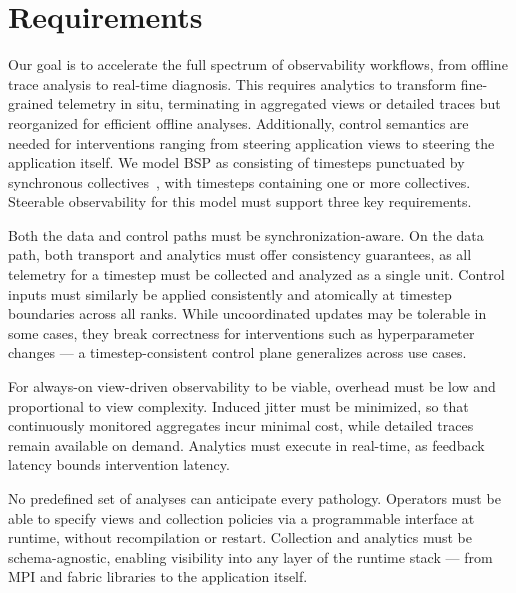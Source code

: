 
\section{Requirements}
\label{sec:orca:req}

Our goal is to accelerate the full spectrum of observability workflows, from offline trace analysis
to real-time diagnosis.
This requires analytics to transform fine-grained telemetry in situ, terminating in aggregated
views or detailed traces but reorganized for efficient offline analyses.
Additionally, control semantics are needed for interventions ranging from steering application views to steering the
application itself.
We model BSP as consisting of timesteps punctuated by synchronous collectives~\cite{:MPI,:NCCL},
with timesteps containing one or more collectives.
Steerable observability for this model must support three key requirements.


Both the data and control paths must be synchronization-aware.
On the data path, both transport and analytics must offer consistency guarantees, as all telemetry
for a timestep must be collected and analyzed as a single unit.
Control inputs must similarly be applied consistently and atomically at timestep boundaries
across all ranks.
While uncoordinated updates may be tolerable in some cases, they break correctness for
interventions such as hyperparameter changes --- a timestep-consistent control plane generalizes
across use cases.

For always-on view-driven observability to be viable, overhead must be low and proportional to view
complexity.
Induced jitter must be minimized, so that continuously monitored aggregates incur minimal cost,
while detailed traces remain available on demand.
Analytics must execute in real-time, as feedback latency bounds intervention latency.


No predefined set of analyses can anticipate every pathology.
Operators must be able to specify views and collection policies via a programmable interface at
runtime, without recompilation or restart.
Collection and analytics must be schema-agnostic, enabling visibility into any layer of the runtime
stack --- from MPI and fabric libraries to the application itself.
\vspace{0.2em}


